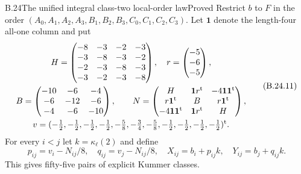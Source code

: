 \begin{statement}{B.24}{The unified integral class-two local-order law}{Proved}
Restrict $b$ to $F$ in the order
$(A_0,A_1,A_2,A_3,B_1,B_2,B_3,C_0,C_1,C_2,C_3)$.
Let $\mathbf 1$ denote the length-four all-one column and put
\[
 \begin{gathered}
 H=\begin{pmatrix}
 -8&-3&-2&-3\\-3&-8&-3&-2\\
 -2&-3&-8&-3\\-3&-2&-3&-8
 \end{pmatrix},\quad r=\begin{pmatrix}-5\\-6\\-5\end{pmatrix},\\
 B=\begin{pmatrix}-10&-6&-4\\-6&-12&-6\\-4&-6&-10\end{pmatrix},
 \qquad
 N=\begin{pmatrix}
 H&{\bf1}r^{\rm t}&-4{\bf1}{\bf1}^{\rm t}\\
 r{\bf1}^{\rm t}&B&r{\bf1}^{\rm t}\\
 -4{\bf1}{\bf1}^{\rm t}&{\bf1}r^{\rm t}&H
 \end{pmatrix},\\
 v=(-\tfrac12,-\tfrac12,-\tfrac12,-\tfrac12,
       -\tfrac58,-\tfrac34,-\tfrac58,
       -\tfrac12,-\tfrac12,-\tfrac12,-\tfrac12)^{\rm t}.
 \end{gathered}                                                 \tag{B.24.11}
\]
For every $i<j$ let $k=\kappa_\ell(2)$ and define
\[
 p_{ij}=v_i-N_{ij}/8,\quad q_{ij}=v_j-N_{ij}/8,\quad
 X_{ij}=b_i+p_{ij}k,\quad Y_{ij}=b_j+q_{ij}k .
                                                               \tag{B.24.12}
\]
This gives fifty-five pairs of explicit Kummer classes.


\end{statement}
